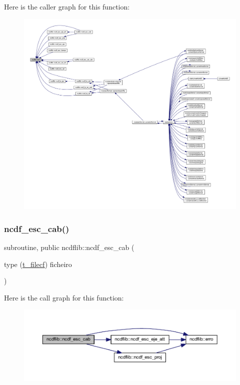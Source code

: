 Here is the caller graph for this function\+:\nopagebreak
\begin{figure}[H]
\begin{center}
\leavevmode
\includegraphics[width=350pt]{namespacencdflib_a67d87694106e0b29a70cb174d730d570_icgraph}
\end{center}
\end{figure}
\mbox{\label{namespacencdflib_a513dad5b1d92a6ff5006b8c276dc1076}} 
\subsubsection{\texorpdfstring{ncdf\+\_\+esc\+\_\+cab()}{ncdf\_esc\_cab()}}
{\footnotesize\ttfamily subroutine, public ncdflib\+::ncdf\+\_\+esc\+\_\+cab (\begin{DoxyParamCaption}\item[{type (\mbox{\hyperlink{structncdflib_1_1t__filecf}{t\+\_\+filecf}})}]{ficheiro }\end{DoxyParamCaption})}

Here is the call graph for this function\+:\nopagebreak
\begin{figure}[H]
\begin{center}
\leavevmode
\includegraphics[width=350pt]{namespacencdflib_a513dad5b1d92a6ff5006b8c276dc1076_cgraph}
\end{center}
\end{figure}
\mbox{\label{namespacencdflib_a15543143f5feb2ff655f4b60aeae5354}} 
